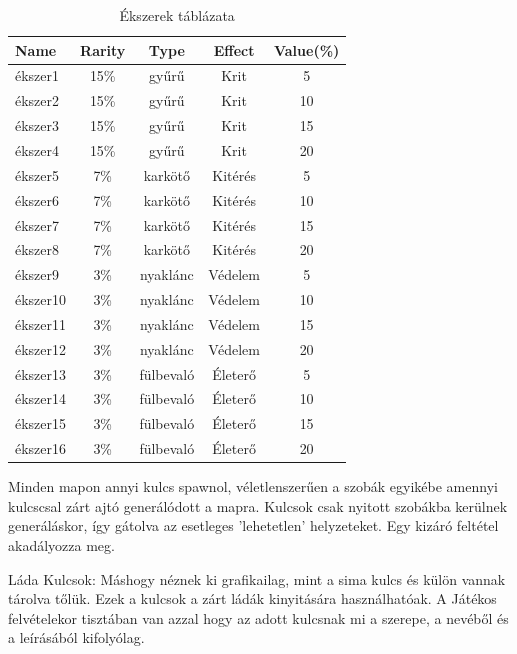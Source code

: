 \begin{table}[!ht]
\centering
\caption{Ékszerek táblázata}
\label{tab:table5}
\begin{tabular}{|l|c|c|c|c|}
\hline
 Name & Rarity & Type & Effect & Value(\%) \\
\hline
 ékszer1 & 15\% & gyűrű & Krit & 5 \\
\hline
 ékszer2 & 15\% & gyűrű & Krit & 10 \\
\hline
 ékszer3 & 15\% & gyűrű & Krit & 15\\
\hline
 ékszer4 & 15\% & gyűrű & Krit  & 20\\
\hline
 ékszer5 & 7\% & karkötő & Kitérés & 5 \\
\hline
 ékszer6 & 7\% & karkötő & Kitérés & 10 \\
\hline
 ékszer7 & 7\% & karkötő & Kitérés & 15\\
\hline
 ékszer8 & 7\% & karkötő & Kitérés  & 20\\
 \hline
 ékszer9 & 3\% & nyaklánc & Védelem & 5 \\
\hline
 ékszer10 & 3\% & nyaklánc & Védelem & 10 \\
\hline
 ékszer11 & 3\% & nyaklánc & Védelem & 15\\
\hline
 ékszer12 & 3\% & nyaklánc & Védelem  & 20\\
 \hline
 ékszer13 & 3\% & fülbevaló & Életerő & 5 \\
\hline
 ékszer14 & 3\% & fülbevaló & Életerő & 10 \\
\hline
 ékszer15 & 3\% & fülbevaló & Életerő & 15\\
\hline
 ékszer16 & 3\% & fülbevaló & Életerő  & 20\\
 \hline
\end{tabular}
\end{table}

\newpage


Minden mapon annyi kulcs spawnol, véletlenszerűen a szobák egyikébe amennyi kulcs\-csal zárt ajtó generálódott a mapra.
Kulcsok csak nyitott szobákba kerülnek generáláskor, így gátolva az esetleges 'lehetetlen' helyzeteket. Egy kizáró feltétel akadályozza meg.

Láda Kulcsok:
Máshogy néznek ki grafikailag, mint a sima kulcs és külön vannak tárolva tőlük. Ezek a kulcsok a zárt ládák kinyitására használhatóak.
A Játékos felvételekor tisztában van azzal hogy az adott kulcsnak mi a szerepe, a nevéből és a leírásából kifolyólag.

